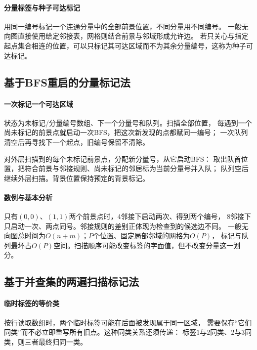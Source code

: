 \paragraph{分量标签与种子可达标记}
用同一编号标记一个连通分量中的全部前景位置，不同分量用不同编号。
一般无向图直接使用给定邻接表，网格则结合前景与邻域形成允许边。
若只关心与指定起点集合相连的位置，可以只标记其可达区域而不为其余分量编号，这称为种子可达标记。

\subsection{基于BFS重启的分量标记法}

\paragraph{一次标记一个可达区域}
状态为未标记/分量编号数组、下一个分量号和队列。扫描全部位置，
每遇到一个尚未标记的前景点就启动一次BFS，把这次新发现的点都赋同一编号；
一次队列清空后再寻找下一个起点，旧编号保留不清除。
\begin{algorithm}[重启BFS分量标记]
  对外层扫描到的每个未标记前景点，分配新分量号，从它启动BFS：
  取出队首位置，把符合前景与邻接规则、尚未标记的邻居标为当前分量号并入队；
  队列空后继续外层扫描。背景位置保持预定的背景标记。
\end{algorithm}

\paragraph{数例与基本分析}
只有$(0,0)$、$(1,1)$两个前景点时，4邻接下启动两次、得到两个编号，
8邻接下只启动一次、两点同号。邻接规则的差别正体现为检查到的候选边不同。
一般无向图总时间为$O(n+m)$；$P$个位置、固定局部邻域的网格为$O(P)$，
标记与队列最坏占$O(P)$空间。扫描顺序可能改变标签的字面值，但不改变分量这一划分。

\subsection{基于并查集的两遍扫描标记法}

\paragraph{临时标签的等价类}
按行读取数组时，两个临时标签可能在后面被发现属于同一区域，
需要保存“它们同类”而不必立即重写所有旧点。这种同类关系还须传递：
标签$1$与$2$同类、$2$与$3$同类，则三者最终归同一类。

